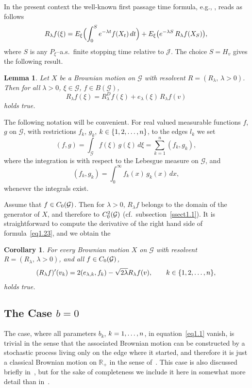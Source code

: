 \documentclass[11pt,a4paper]{amsart}
\newcommand{\gl}{\lambda}
\newcommand{\cG}{\mathcal{G}}
\newcommand{\cJ}{\mathcal{J}}
\newcommand{\1}{1}
\newcommand{\R}{\mathbb{R}}
\newtheorem{lemma}[theorem]{Lemma}
\newtheorem{corollary}[theorem]{Corollary}
\theoremstyle{remark}
\newcommand{\sgl}{\ensuremath\sqrt{2\gl}}
\newcommand{\sn}{\ensuremath\{1,2,\dotsc,n\}}
\newcommand{\Co}{\ensuremath C_0(\cG)}
\newcommand{\Cii}{\ensuremath C_0^2(\cG)}
\newcommand{\kn}{\ensuremath k=1,\dotsc,n}
\numberwithin{equation}{section}
\begin{document}
\vspace{.5\baselineskip}
In the present context the well-known first passage time formula, e.g., \cite{Ra56, ItMc74},
reads as follows
\begin{equation*}
    R_\gl f(\xi) = E_\xi\Bigl(\int_0^S e^{-\gl t} f(X_t)\,dt\Bigr)
                    + E_\xi\bigl(e^{-\gl S}\,R_\gl f(X_S)\bigr),
\end{equation*}
where $S$ is any $P_\xi$--a.s.\ finite stopping time relative to $\cJ$.
The choice $S=H_v$ gives the following result.

\begin{lemma}   \label{lem1.4}
Let $X$ be a Brownian motion on $\cG$ with resolvent $R=(R_\gl,\,\gl>0)$. Then
for all $\gl>0$, $\xi\in\cG$, $f\in B(\cG)$,
\begin{equation}    \label{eq1.23}
    R_\gl f(\xi) = R^D_\gl f(\xi) + e_\gl(\xi)\,R_\gl f(v)
\end{equation}
holds true.
\end{lemma}

The following notation will be convenient. For real valued measurable functions
$f$, $g$ on $\cG$, with restrictions $f_k$, $g_k$, $k\in\sn$, to the edges
$l_k$ we set
\begin{equation*}
    (f,g) = \int_{\cG} f(\xi)\,g(\xi)\,d\xi = \sum_{k=1}^n (f_k,g_k),
\end{equation*}
where the integration is with respect to the Lebesgue measure on $\cG$, and
\begin{equation*}
    (f_k,g_k) = \int_0^\infty f_k(x)\,g_k(x)\,dx,
\end{equation*}
whenever the integrals exist.

Assume that $f\in\Co$. Then for $\gl>0$, $R_\gl f$ belongs to the domain of the
ge\-ne\-ra\-tor of $X$, and therefore to $\Cii$ (cf.\ subsection~\ref{ssect1.1}).
It is straightforward to compute the derivative of the right hand side of
formula~\eqref{eq1.23}, and we obtain the

\begin{corollary}   \label{cor1.5}
For every Brownian motion $X$ on $\cG$ with resolvent $R=(R_\gl,\,\gl>0)$,
and all $f\in\Co$,
\begin{equation}    \label{eq1.24}
    (R_\gl f)'(v_k) = 2(e_{\gl,k},f_k) - \sgl R_\gl f(v),\qquad k\in\sn,
\end{equation}
holds true.
\end{corollary}

\subsection{\boldmath The Case $b=0$}     \label{ssect1.4}
The case, where all parameters $b_k$, $\kn$, in equation~\eqref{eq1.1} vanish, is
trivial in the sense that the associated Brownian motion can be constructed by a
stochastic process living only on the edge where it started, and therefore it is
just a classical Brownian motion on $\R_+$ in the sense of~\cite[Section~6.1]{Kn81}.
This case is also discussed briefly in~\cite{Kn81}, but for the sake of completeness
we include it here in somewhat more detail than in~\cite{Kn81}.
\end{document}
